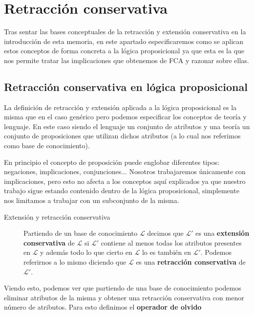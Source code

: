 \chapter*{Retracción conservativa}

	
	Tras sentar las bases conceptuales de la retracción y extensión conservativa en la introducción de esta memoria, en este apartado especificaremos como se aplican estos conceptos de forma concreta a la lógica proposicional ya que esta es la que nos permite tratar las implicaciones que obtenemos de FCA y razonar sobre ellas.
	
	
\section*{Retracción conservativa en lógica proposicional}

	La definición de retracción y extensión aplicada a la lógica proposicional es la misma que en el caso genérico pero podemos especificar los conceptos de teoría y lenguaje. En este caso siendo el lenguaje un conjunto de atributos y una teoría un conjunto de proposiciones que utilizan dichos atributos (a lo cual nos referimos como base de conocimiento).
	
	En principio el concepto de proposición puede englobar diferentes tipos: negaciones, implicaciones, conjunciones... Nosotros trabajaremos únicamente con implicaciones, pero esto no afecta a los conceptos aquí explicados ya que nuestro trabajo sigue estando contenido dentro de la lógica proposicional, simplemente nos limitamos a trabajar con un subconjunto de la misma.
	
	\begin{description}
		\item[Extensión y retracción conservativa] 
			Partiendo de un base de conocimiento $\mathcal{L}$ decimos que $\mathcal{L'}$ es una \textbf{extensión conservativa} 
			de $\mathcal{L}$ si $\mathcal{L'}$ contiene al menos todas los atributos presentes en $\mathcal{L}$ y 
			además todo lo que cierto en $\mathcal{L}$ lo es también en $\mathcal{L'}$. Podemos referirnos a lo mismo 
			diciendo que $\mathcal{L}$ es una \textbf{retracción conservativa} de $\mathcal{L'}$. 
	\end{description}

	Viendo esto, podemos ver que partiendo de una base de conocimiento podemos eliminar atributos de la misma y obtener una retracción conservativa con menor número de atributos. Para esto definimos el \textbf{operador de olvido}
 	
